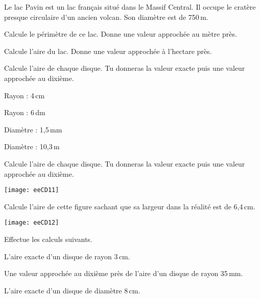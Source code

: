 \begin{exercice}[]
Le lac Pavin est un lac français situé dans le Massif Central. Il occupe le cratère presque circulaire d'un ancien volcan. Son diamètre est de 750\,m. 

\begin{colenumerate}{1} 
\item Calcule le périmètre de ce lac. Donne une valeur approchée au mètre près.
\item Calcule l'aire du lac. Donne une valeur approchée à l'hectare près.
\end{colenumerate} 

\end{exercice}






\begin{exercice}[]
Calcule l'aire de chaque disque. Tu donneras la valeur exacte puis une valeur approchée au dixième.

\begin{colenumerate}{2} 
\item Rayon : 4\,cm
\item Rayon : 6\,dm
\item Diamètre : 1,5\,mm 
\item Diamètre : 10,3\,m
\end{colenumerate} 
\end{exercice}

\begin{exercice}[]
Calcule l'aire de chaque disque. Tu donneras la valeur exacte puis une valeur approchée au dixième.

\begin{center}
    \texttt{[image: eeCD11]}
\end{center}
\end{exercice}

\begin{exercice}[]
Calcule l'aire de cette figure sachant que sa largeur dans la réalité est de 6,4\,cm.

\begin{center}
    \texttt{[image: eeCD12]}
\end{center}
\end{exercice}


\begin{exercice}[]
Effectue les calculs suivants.

\begin{colenumerate}{1} 
\item L'aire exacte d'un disque de rayon 3\,cm.
\item Une valeur approchée au dixième près de l'aire d'un disque de rayon 35\,mm.
\item L'aire exacte d'un disque de diamètre 8\,cm.
\end{colenumerate} 
\end{exercice}


